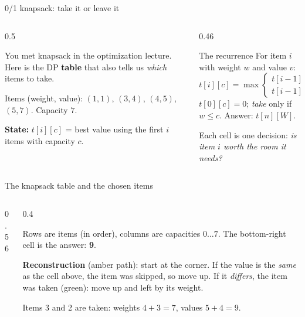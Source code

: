 \documentclass[aspectratio=169,10pt]{beamer}
\newcommand{\figtab}[2][0.5]{\begin{sfig}[#1]\end{sfig}}
\begin{document}
\begin{frame}{0/1 knapsack: take it or leave it}
\begin{columns}[T]
\begin{column}{0.5\textwidth}
{\small
You met knapsack in the optimization lecture. Here is the DP \textbf{table} that also tells us \emph{which} items to take.

\vspace{2mm}
Items (weight, value): $(1,1)$, $(3,4)$, $(4,5)$, $(5,7)$. Capacity $7$.

\vspace{2mm}
\textbf{State:} $t[i][c]$ = best value using the first $i$ items with capacity $c$.}
\end{column}
\begin{column}{0.46\textwidth}
\begin{block}{The recurrence}
{\small For item $i$ with weight $w$ and value $v$:
\[
t[i][c]=\max\begin{cases}
t[i-1][c] & \text{skip}\\
t[i-1][c-w]+v & \text{take}
\end{cases}\]
$t[0][c]=0$; \emph{take} only if $w\le c$. Answer: $t[n][W]$.}
\end{block}
\vspace{1mm}
{\small Each cell is one decision: \emph{is item $i$ worth the room it needs?}}
\end{column}
\end{columns}
\end{frame}

\begin{frame}{The knapsack table and the chosen items}
\begin{columns}[T]
\begin{column}{0.56\textwidth}
\figtab[0.82]{fig_knap}
\end{column}
\begin{column}{0.4\textwidth}
{\small
Rows are items (in order), columns are capacities $0\ldots7$. The bottom-right cell is the answer: \textbf{9}.

\vspace{2mm}
\textbf{Reconstruction} (amber path): start at the corner. If the value is the \emph{same} as the cell above, the item was skipped, so move up. If it \emph{differs}, the item was taken (\colorbox{tdGreen!40}{green}): move up and left by its weight.

\vspace{2mm}
Items 3 and 2 are taken: weights $4+3=7$, values $5+4=9$.}
\end{column}
\end{columns}
\end{frame}
\end{document}
